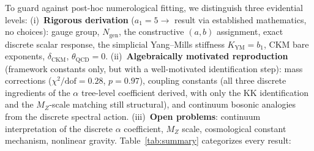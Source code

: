 \documentclass[12pt,a4paper]{article}
\theoremstyle{definition}
\begin{document}
To guard against post-hoc numerological fitting, we distinguish three evidential levels: (i)~\textbf{Rigorous derivation} ($a_1 = 5 \to$ result via established mathematics, no choices): gauge group, $N_{\text{gen}}$, the constructive $(a,b)$ assignment, exact discrete scalar response, the simplicial Yang--Mills stiffness $K_{\mathrm{YM}} = b_1$, CKM bare exponents, $\delta_{\text{CKM}}$, $\theta_{\text{QCD}} = 0$.  (ii)~\textbf{Algebraically motivated reproduction} (framework constants only, but with a well-motivated identification step): mass corrections ($\chi^2/\text{dof} = 0.28$, $p = 0.97$), coupling constants (all three discrete ingredients of the $\alpha$ tree-level coefficient derived, with only the KK identification and the $M_Z$-scale matching still structural), and continuum bosonic analogies from the discrete spectral action.  (iii)~\textbf{Open problems}: continuum interpretation of the discrete $\alpha$ coefficient, $M_Z$ scale, cosmological constant mechanism, nonlinear gravity.  Table~\ref{tab:summary} categorizes every result:
\end{document}
